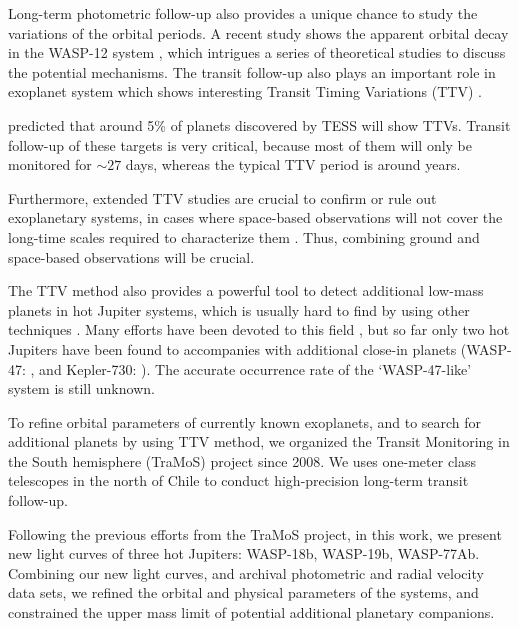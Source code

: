 Long-term photometric follow-up also provides a unique chance to study the variations of the orbital periods. A recent study shows the apparent orbital decay in the WASP-12 system \citep{Patra2017}, which intrigues a series of theoretical studies \citep{Millholland2018,Weinberg2017} to discuss the potential mechanisms. The transit follow-up also plays an important role in exoplanet system which shows interesting Transit Timing Variations (TTV) \citep{Ballard2011,Ford2012a,Steffen2012,Fabrycky2012,Mancini2016,WangS2017,Wu2018}. 

\cite{Ballard2018} predicted that around 5\% of planets discovered by TESS \citep{Ricker2014} will show TTVs. Transit follow-up of these targets is very critical, because most of them will only be monitored for $\sim27$ days, whereas the typical TTV period is around years. 

Furthermore, extended TTV studies are crucial to confirm or rule out exoplanetary systems, in cases where space-based observations will not cover the long-time scales required to characterize them \citep{vonEssen2018}. Thus, combining ground and space-based observations will be crucial. 

The TTV method \citep{Miralda2002,Agol2005,Holman2005}  also provides a powerful tool to detect additional low-mass planets in hot Jupiter systems, which is usually hard to find by using other techniques \citep{Steffen2012b}. Many efforts have been devoted to this field \citep{Pal2011,Hoyer2012,Hoyer2013,Szabo2013}, but so far only two hot Jupiters have been found to accompanies with additional close-in planets (WASP-47: \cite{Becker2015}, and Kepler-730: \cite{Canas2019}). The accurate occurrence rate of the `WASP-47-like' system is still unknown.

To refine orbital parameters of currently known exoplanets, and to search for additional planets by using TTV method, we organized the Transit Monitoring in the South hemisphere (TraMoS) project \citep{Hoyer2011} since 2008. We uses one-meter class telescopes in the north of Chile to conduct high-precision long-term transit follow-up. 

Following the previous efforts from the TraMoS project, in this work, we present new light curves of three hot Jupiters: WASP-18b, WASP-19b, WASP-77Ab. Combining our new light curves, and archival photometric and radial velocity data sets, we refined the orbital and physical parameters of the systems, and constrained the upper mass limit of potential additional planetary companions. 

